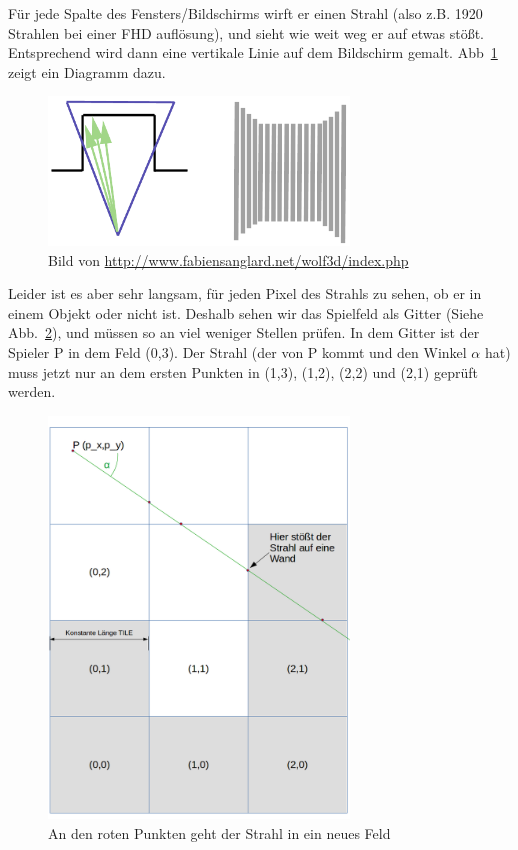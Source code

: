 \documentclass[a4paper,12pt]{report}
\begin{document}
Für jede Spalte des Fensters/Bildschirms wirft er einen Strahl (also z.B. 1920 Strahlen bei einer FHD auflösung), und sieht wie weit weg er auf etwas stößt. Entsprechend wird dann eine vertikale Linie auf dem Bildschirm gemalt. Abb~\ref{fig:rcaster} zeigt ein Diagramm dazu.
\begin{figure}[htbp] 
        \centering
        \includegraphics[width=8cm]{raycasting.png} 
        \caption{Bild von \url{http://www.fabiensanglard.net/wolf3d/index.php}}
        \label{fig:rcaster}
\end{figure}

Leider ist es aber sehr langsam, für jeden Pixel des Strahls zu sehen, ob er in einem Objekt oder nicht ist. Deshalb sehen wir das Spielfeld als Gitter (Siehe Abb.~\ref{fig:grid}), und müssen so an viel weniger Stellen prüfen. In dem Gitter ist der Spieler P in dem Feld (0,3). Der Strahl (der von P kommt und den Winkel $\alpha$ hat) muss jetzt nur an dem ersten Punkten in (1,3), (1,2), (2,2) und (2,1) geprüft werden.
\begin{figure}[htbp]
        \centering
        \includegraphics[width=8cm]{grid.png} 
        \caption{An den roten Punkten geht der Strahl in ein neues Feld}
        \label{fig:grid}
\end{figure}
\end{document}
